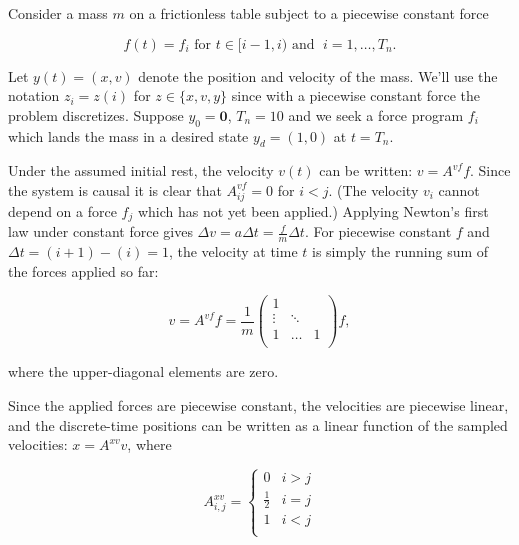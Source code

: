 \documentclass[12pt]{article}
\begin{document}
Consider a mass $m$ on a frictionless table subject to a piecewise constant force

\begin{equation*}
	f(t) = f_i \text{ for } t \in [i - 1, i) \text{ and } \; i = 1, \ldots, T_n.
\end{equation*}

\bigbreak

Let $y(t) = (x, v)$ denote the position and velocity of the mass. We'll use the notation $z_i = z(i)$ for $z \in \{x, v, y\}$ since with a piecewise
constant force the problem discretizes. Suppose $y_0 = \mathbf{0}$, $T_n = 10$ and we seek a force program $f_i$  which lands the mass in a desired state $y_d = (1, 0)$ at $t = T_n$. 

\bigbreak

\noindent Under the assumed initial rest, the velocity $v(t)$ can be written: $v = A^{vf} f$. Since the system is causal it is clear that $A^{vf}_{ij} = 0$ for $i < j$. (The velocity $v_i$ cannot depend on a force $f_j$ which has not yet been applied.) Applying Newton's first law under constant force gives $\Delta v = a \Delta t = \frac{f}{m} \Delta t$. For piecewise constant $f$ and $\Delta t = (i+1) - (i) = 1$, the velocity at time $t$ is simply the running sum of the forces applied so far:

\begin{equation*}
	v = A^{vf} f = \frac{1}{m}
	\begin{pmatrix}
	    1      &        &   \\
	    \vdots & \ddots &   \\
	    1      & \hdots & 1 \\
	\end{pmatrix} f,
\end{equation*}

where the upper-diagonal elements are zero. 

\bigbreak

Since the applied forces are piecewise constant, the velocities are piecewise linear, and the discrete-time positions can be written as a linear function of the sampled velocities: $x = A^{xv} v$, where

\bigbreak

\begin{equation*}
A^{xv}_{i, j} = 
\left\{
\begin{array}{ll}
      0 & i > j \\
      \frac{1}{2} & i = j \\
      1 & i < j \\
\end{array} 
\right.
\end{equation*}
\end{document}
